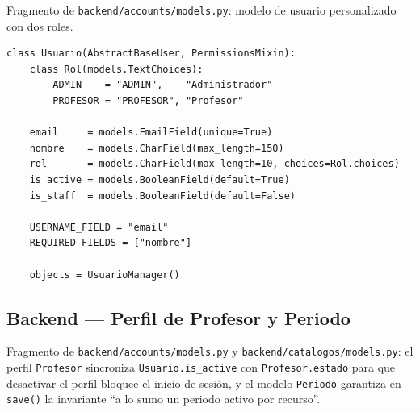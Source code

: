Fragmento de \texttt{backend/accounts/models.py}: modelo de usuario personalizado con dos roles.

\begin{Verbatim}[fontsize=\small, frame=single]
class Usuario(AbstractBaseUser, PermissionsMixin):
    class Rol(models.TextChoices):
        ADMIN    = "ADMIN",    "Administrador"
        PROFESOR = "PROFESOR", "Profesor"

    email     = models.EmailField(unique=True)
    nombre    = models.CharField(max_length=150)
    rol       = models.CharField(max_length=10, choices=Rol.choices)
    is_active = models.BooleanField(default=True)
    is_staff  = models.BooleanField(default=False)

    USERNAME_FIELD = "email"
    REQUIRED_FIELDS = ["nombre"]

    objects = UsuarioManager()
\end{Verbatim}

\subsection{Backend --- Perfil de Profesor y Periodo}\label{lst:modelos_perfil_periodo}

Fragmento de \texttt{backend/accounts/models.py} y \texttt{backend/catalogos/models.py}: el perfil \texttt{Profesor} sincroniza \texttt{Usuario.is\_active} con \texttt{Profesor.estado} para que desactivar el perfil bloquee el inicio de sesión, y el modelo \texttt{Periodo} garantiza en \texttt{save()} la invariante ``a lo sumo un periodo activo por recurso''.

